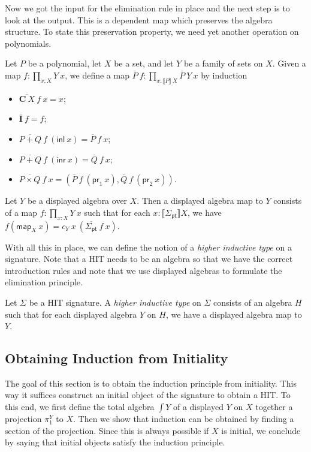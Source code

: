 \documentclass[9pt]{entcs}
\newcommand{\term}[1]{\mathsf{#1}}
\newcommand{\constructor}[1]{\mathbf{#1}}
\newcommand{\function}[1]{\mathsf{#1}}
\newcommand{\deprod}[3]{\prod_{#1 : #2} #3} %
\newcommand{\0}{\textbf{0}} %
\newcommand{\1}{\textbf{1}} %
\newcommand{\inl}{\term{inl}} %
\newcommand{\inr}{\term{inr}} %
\newcommand{\prl}{\term{pr}_1} %
\newcommand{\prr}{\term{pr}_2} %
\newcommand{\C}{\constructor{C}} %
\newcommand{\I}{\constructor{I}} %
\newcommand{\sumP}[2]{#1 + #2} %
\newcommand{\prodP}[2]{#1 \times #2} %
\newcommand{\pt}[0]{\textsf{pt}}
\newcommand{\pointc}[1]{#1_{\pt}} %
\newcommand{\semP}[1]{\llbracket #1 \rrbracket} %
\newcommand{\constrA}[1]{\function{map}_{#1}} %
\newcommand{\polydact}[2]{\overline{#1} \> #2} %
\newcommand{\polydmap}[2]{\overline{#1} \> #2} %
\newcommand{\total}[1]{\int #1} %
\newcommand{\proj}[1]{\pi_1^{#1}} %
\begin{document}
Now we got the input for the elimination rule in place and the next step is to look at the output.
This is a dependent map which preserves the algebra structure.
To state this preservation property, we need yet another operation on polynomials.

\begin{definition}
Let $P$ be a polynomial, let $X$ be a set, and let $Y$ be a family of sets on $X$.
Given a map $f : \deprod{x}{X}{Y \> x}$, we define a map $\polydmap{P}{f} : \deprod{x}{\semP{P} \> X}{\polydact{P}{Y} \> x}$ by induction
\begin{itemize}
	\item $\polydmap{\C \> X}{f} \> x = x$;
	\item $\polydmap{\I}{f} = f$;
	\item $\polydmap{\sumP{P}{Q}}{f} \> (\inl \> x) = \polydmap{P}{f} \> x$;
	\item $\polydmap{\sumP{P}{Q}}{f} \> (\inr \> x) = \polydmap{Q}{f} \> x$;
	\item $\polydmap{\prodP{P}{Q}}{f} \> x = (\polydact{P}{f} \> (\prl \> x) , \polydact{Q}{f} \> (\prr \> x))$.
\end{itemize}
\end{definition}

\begin{definition}
Let $Y$ be a displayed algebra over $X$.
Then a displayed algebra map to $Y$ consists of a map $f : \deprod{x}{X}{Y \> x}$ such that for each $x : \semP{\pointc{\Sigma}}{X}$, we have $f(\constrA{X} \> x) = c_Y \> x \> (\polydmap{\pointc{\Sigma}}{f} \> x)$.
\end{definition}

With all this in place, we can define the notion of a \emph{higher inductive type} on a signature.
Note that a HIT needs to be an algebra so that we have the correct introduction rules and note that we use displayed algebras to formulate the elimination principle.

\begin{definition}
Let $\Sigma$ be a HIT signature.
A \emph{higher inductive type} on $\Sigma$ consists of an algebra $H$ such that for each displayed algebra $Y$ on $H$, we have a displayed algebra map to $Y$.
\end{definition}

\subsection{Obtaining Induction from Initiality}
The goal of this section is to obtain the induction principle from initiality.
This way it suffices construct an initial object of the signature to obtain a HIT.
To this end, we first define the total algebra $\total{Y}$ of a displayed $Y$ on $X$ together a projection $\proj{Y}$ to $X$.
Then we show that induction can be obtained by finding a section of the projection.
Since this is always possible if $X$ is initial, we conclude by saying that initial objects satisfy the induction principle.
\end{document}
